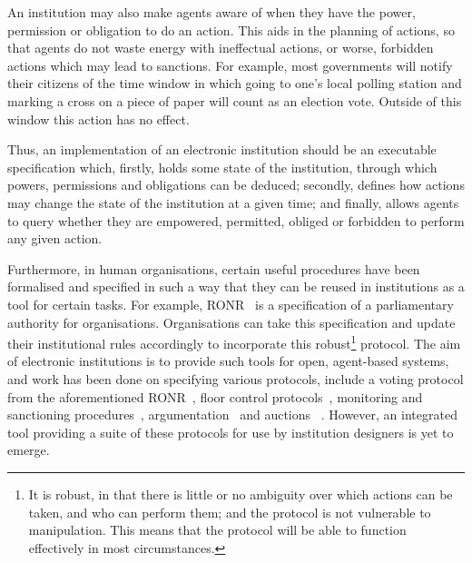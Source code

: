 
An institution may also make agents aware of when they have the power,
permission or obligation to do an action. This aids in the planning of actions,
so that agents do not waste energy with ineffectual actions, or worse, forbidden
actions which may lead to sanctions. For example, most governments will notify
their citizens of the time window in which going to one's local polling station
and marking a cross on a piece of paper will count as an election vote. Outside 
of this window this action has no effect.

Thus, an implementation of an electronic institution should be an executable
specification which, firstly, holds some state of the institution, through which
powers, permissions and obligations can be deduced; secondly, defines how
actions may change the state of the institution at a given time; and finally,
allows agents to query whether they are empowered, permitted, obliged or forbidden to perform
any given action.

Furthermore, in human organisations, certain useful procedures have been
formalised and specified in such a way that they can be reused in institutions
as a tool for certain tasks. For example, \ac{RONR}~\citep{Robert2011} is a
specification of a parliamentary authority for organisations. Organisations
can take this specification and update their institutional rules accordingly
to incorporate this robust\footnote{It is robust, in that there is little or no ambiguity over which actions can be taken, and who can perform them; and the protocol is not vulnerable to manipulation. This means that the protocol will be able to function effectively in most circumstances.}
 protocol. The aim of electronic institutions is to
provide such tools for open, agent-based systems, and work has been done on
specifying various protocols, include a voting protocol from the aforementioned
\ac{RONR}~\citep{Pitt2005a}, floor control
protocols~\citep{Artikis2004,Artikis2009b}, monitoring and sanctioning
procedures~\citep{Pitt2012c}, argumentation~\citep{Artikis2003} and auctions~
\citep{Rodriguez1997}. However, an integrated tool
providing a suite of these protocols for use by institution designers 
is yet to emerge.

